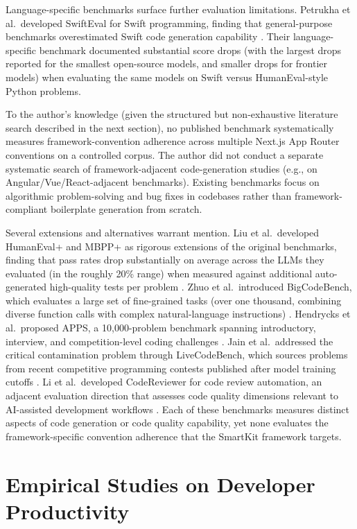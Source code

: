 \documentclass[12pt,a4paper]{report}
\begin{document}
Language-specific benchmarks surface further evaluation limitations. Petrukha et al.\ developed SwiftEval for Swift programming, finding that general-purpose benchmarks overestimated Swift code generation capability \parencite{petrukha2025swifteval}. Their language-specific benchmark documented substantial score drops (with the largest drops reported for the smallest open-source models, and smaller drops for frontier models) when evaluating the same models on Swift versus HumanEval-style Python problems.

To the author's knowledge (given the structured but non-exhaustive literature search described in the next section), no published benchmark systematically measures framework-convention adherence across multiple Next.js App Router conventions on a controlled corpus. The author did not conduct a separate systematic search of framework-adjacent code-generation studies (e.g., on Angular/Vue/React-adjacent benchmarks). Existing benchmarks focus on algorithmic problem-solving and bug fixes in codebases rather than framework-compliant boilerplate generation from scratch.

Several extensions and alternatives warrant mention. Liu et al.\ developed HumanEval+ and MBPP+ as rigorous extensions of the original benchmarks, finding that pass rates drop substantially on average across the LLMs they evaluated (in the roughly 20\% range) when measured against additional auto-generated high-quality tests per problem \parencite{liu2024correct}. Zhuo et al.\ introduced BigCodeBench, which evaluates a large set of fine-grained tasks (over one thousand, combining diverse function calls with complex natural-language instructions) \parencite{zhuo2024bigcodebench}. Hendrycks et al.\ proposed APPS, a 10{,}000-problem benchmark spanning introductory, interview, and competition-level coding challenges \parencite{hendrycks2021apps}. Jain et al.\ addressed the critical contamination problem through LiveCodeBench, which sources problems from recent competitive programming contests published after model training cutoffs \parencite{jain2024livecodebench}. Li et al.\ developed CodeReviewer for code review automation, an adjacent evaluation direction that assesses code quality dimensions relevant to AI-assisted development workflows \parencite{li2022codereviewer}. Each of these benchmarks measures distinct aspects of code generation or code quality capability, yet none evaluates the framework-specific convention adherence that the SmartKit framework targets.

\section{Empirical Studies on Developer Productivity}
\end{document}

